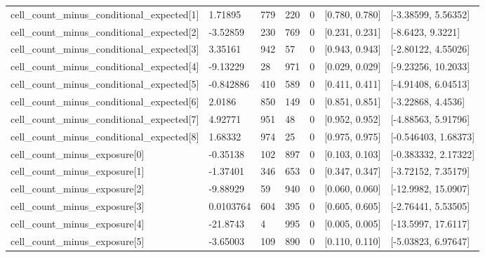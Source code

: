 \begin{longtable}
{}cell\_\allowbreak{}count\_\allowbreak{}minus\_\allowbreak{}conditional\_\allowbreak{}expected[1] & 1.71895 & 779 & 220 & 0 & [0.780, 0.780] & [-3.38599, 5.56352] \\
{}cell\_\allowbreak{}count\_\allowbreak{}minus\_\allowbreak{}conditional\_\allowbreak{}expected[2] & -3.52859 & 230 & 769 & 0 & [0.231, 0.231] & [-8.6423, 9.3221] \\
{}cell\_\allowbreak{}count\_\allowbreak{}minus\_\allowbreak{}conditional\_\allowbreak{}expected[3] & 3.35161 & 942 & 57 & 0 & [0.943, 0.943] & [-2.80122, 4.55026] \\
{}cell\_\allowbreak{}count\_\allowbreak{}minus\_\allowbreak{}conditional\_\allowbreak{}expected[4] & -9.13229 & 28 & 971 & 0 & [0.029, 0.029] & [-9.23256, 10.2033] \\
{}cell\_\allowbreak{}count\_\allowbreak{}minus\_\allowbreak{}conditional\_\allowbreak{}expected[5] & -0.842886 & 410 & 589 & 0 & [0.411, 0.411] & [-4.91408, 6.04513] \\
{}cell\_\allowbreak{}count\_\allowbreak{}minus\_\allowbreak{}conditional\_\allowbreak{}expected[6] & 2.0186 & 850 & 149 & 0 & [0.851, 0.851] & [-3.22868, 4.4536] \\
{}cell\_\allowbreak{}count\_\allowbreak{}minus\_\allowbreak{}conditional\_\allowbreak{}expected[7] & 4.92771 & 951 & 48 & 0 & [0.952, 0.952] & [-4.88563, 5.91796] \\
{}cell\_\allowbreak{}count\_\allowbreak{}minus\_\allowbreak{}conditional\_\allowbreak{}expected[8] & 1.68332 & 974 & 25 & 0 & [0.975, 0.975] & [-0.546403, 1.68373] \\
{}cell\_\allowbreak{}count\_\allowbreak{}minus\_\allowbreak{}exposure[0] & -0.35138 & 102 & 897 & 0 & [0.103, 0.103] & [-0.383332, 2.17322] \\
{}cell\_\allowbreak{}count\_\allowbreak{}minus\_\allowbreak{}exposure[1] & -1.37401 & 346 & 653 & 0 & [0.347, 0.347] & [-3.72152, 7.35179] \\
{}cell\_\allowbreak{}count\_\allowbreak{}minus\_\allowbreak{}exposure[2] & -9.88929 & 59 & 940 & 0 & [0.060, 0.060] & [-12.9982, 15.0907] \\
{}cell\_\allowbreak{}count\_\allowbreak{}minus\_\allowbreak{}exposure[3] & 0.0103764 & 604 & 395 & 0 & [0.605, 0.605] & [-2.76441, 5.53505] \\
{}cell\_\allowbreak{}count\_\allowbreak{}minus\_\allowbreak{}exposure[4] & -21.8743 & 4 & 995 & 0 & [0.005, 0.005] & [-13.5997, 17.6117] \\
{}cell\_\allowbreak{}count\_\allowbreak{}minus\_\allowbreak{}exposure[5] & -3.65003 & 109 & 890 & 0 & [0.110, 0.110] & [-5.03823, 6.97647] \\

\end{longtable}
